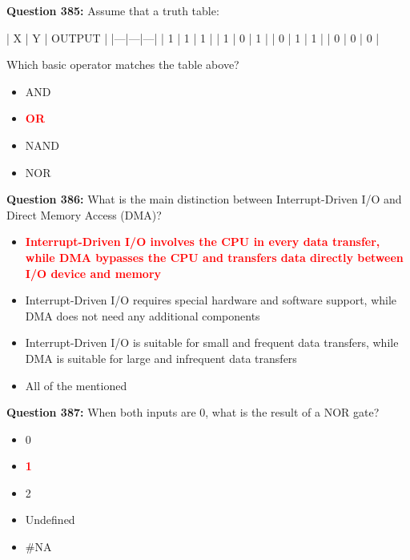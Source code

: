 \documentclass[12pt,a4paper]{article}
\begin{document}
\vspace{0.5cm}

\textbf{Question 385:} Assume that a truth table:

| X | Y | OUTPUT |
|---|---|---|
| 1 | 1 | 1 |
| 1 | 0 | 1 |
| 0 | 1 | 1 |
| 0 | 0 | 0 |

Which basic operator matches the table above?

\begin{itemize}
    \item[\textbf{A.}] AND
    \item[\textbf{B.}] \textcolor{red}{\textbf{OR}}
    \item[\textbf{C.}] NAND
    \item[\textbf{D.}] NOR
\end{itemize}

\vspace{0.5cm}

\textbf{Question 386:} What is the main distinction between Interrupt-Driven I/O and Direct Memory Access (DMA)?

\begin{itemize}
    \item[\textbf{A.}] \textcolor{red}{\textbf{Interrupt-Driven I/O involves the CPU in every data transfer, while DMA bypasses the CPU and transfers data directly between I/O device and memory}}
    \item[\textbf{B.}] Interrupt-Driven I/O requires special hardware and software support, while DMA does not need any additional components
    \item[\textbf{C.}] Interrupt-Driven I/O is suitable for small and frequent data transfers, while DMA is suitable for large and infrequent data transfers
    \item[\textbf{D.}] All of the mentioned
\end{itemize}

\vspace{0.5cm}

\textbf{Question 387:} When both inputs are 0, what is the result of a NOR gate?

\begin{itemize}
    \item[\textbf{A.}] 0
    \item[\textbf{B.}] \textcolor{red}{\textbf{1}}
    \item[\textbf{C.}] 2
    \item[\textbf{D.}] Undefined
    \item[\textbf{E.}] \#NA
\end{itemize}
\end{document}
